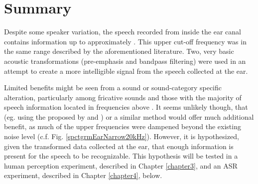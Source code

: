 \section{Summary}\label{chap2:summary}

Despite some speaker variation, the speech recorded from inside the ear canal contains information up to approximately \DIFdelbegin {}\DIFdelend \DIFaddbegin {}\DIFaddend .  This upper cut-off frequency was in the same range described by the aforementioned literature\DIFaddbegin {}\DIFaddend .  Two, very basic acoustic transformations (pre-emphasis and bandpass filtering) were used in an attempt to create a more intelligible signal from the speech collected at the ear.

Limited benefits might be seen from a sound or sound-category specific alteration, particularly among fricative sounds and those with the majority of speech information located in frequencies above \DIFdelbegin {}\DIFdelend \DIFaddbegin {}\DIFaddend .  It seems unlikely though, that \DIFdelbegin {}\DIFdelend \DIFaddbegin {}\DIFaddend (eg. using the \DIFdelbegin {}\DIFdelend \DIFaddbegin {}\DIFaddend proposed by \cite{hansen:97b} and \cite{reinfeldt:10}) or a similar method would offer much additional benefit, as much of the upper frequencies were dampened beyond the existing noise level (c.f. Fig. \ref{spctgrmEarNarrow20kHz}).  However, it is hypothesized, given the transformed data collected at the ear, that enough information is present for the speech to be recognizable.  This hypothesis will be tested in a human perception experiment, described in Chapter \ref{chapter3}, and an ASR experiment, described in Chapter \ref{chapter4}, below.







